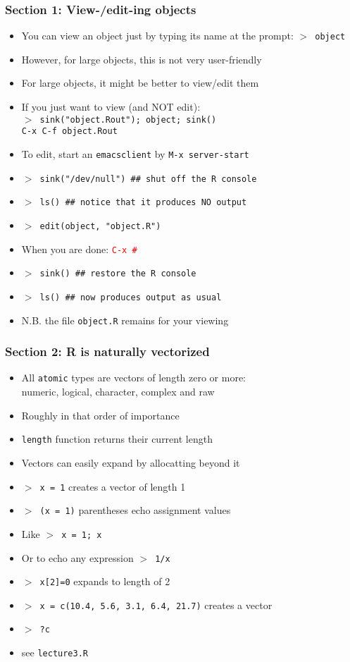 \documentclass[11pt,pdftex,dvipsnames,usenames,helvetica]{beamer}
\begin{document}
\begin{frame} 
\frametitle{Section 1: View-/edit-ing objects}

\begin{itemize}
\item You can view an object just by typing its name at the
prompt: {\tt $>$ object}
\item However, for large objects, this is not very user-friendly
\item For large objects, it might be better to view/edit them
\item If you just want to view (and NOT edit):\\
{\tt $>$ sink("object.Rout"); object; sink()}\\
{\tt C-x C-f object.Rout}
\item To edit, start an {\tt emacsclient} by {\tt M-x server-start}
\item {\tt $>$ sink("/dev/null") \#\# shut off the R console}
\item {\tt $>$ ls() \#\# notice that it produces NO output}
\item {\tt $>$ edit(object, "object.R")}
\item When you are done: \textcolor{red}{\tt C-x \#}
\item {\tt $>$ sink() \#\# restore the R console}
\item {\tt $>$ ls() \#\# now produces output as usual}
\item N.B. the file {\tt object.R} remains for your viewing
\end{itemize} 

\end{frame}

\begin{frame} 
\frametitle{Section 2: R is naturally vectorized}

\begin{itemize}
\item All {\tt atomic} types are vectors of length zero or more:\\
numeric, logical, character, complex and raw
\item Roughly in that order of importance
\item {\tt length} function returns their current length
\item Vectors can easily expand by allocatting beyond it
\item {\tt $>$ x = 1} creates a vector of length 1
\item {\tt $>$ (x = 1)} parentheses echo assignment values
\item Like {\tt  $>$ x = 1; x}
\item Or to echo any expression {\tt $>$ 1/x}
\item {\tt  $>$ x[2]=0} expands to length of 2
\item {\tt $>$ x = c(10.4, 5.6, 3.1, 6.4, 21.7)} creates a vector
\item {\tt $>$ ?c}
\item see {\tt lecture3.R}
\end{itemize} 

\end{frame}
\end{document}

